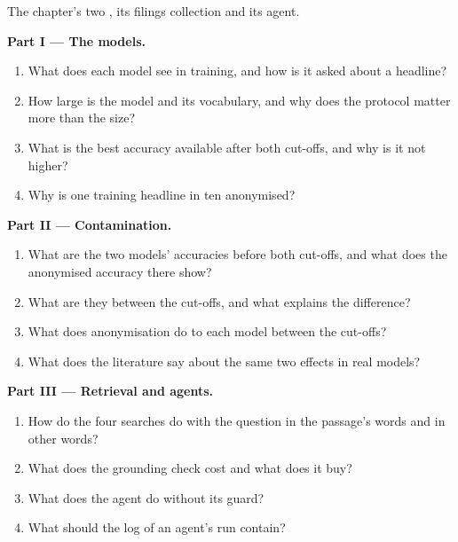 \begin{problem}\label{pb:ml:large-language-models-in-finance:1}
The chapter's two , its filings collection and its agent.

\medskip\noindent\textbf{Part I --- The models.}
\begin{enumerate}
\item What does each model see in training, and how is it asked about a headline?
\item How large is the model and its vocabulary, and why does the protocol matter more than the size?
\item What is the best accuracy available after both cut-offs, and why is it not higher?
\item Why is one training headline in ten anonymised?
\end{enumerate}

\medskip\noindent\textbf{Part II --- Contamination.}
\begin{enumerate}[resume]
\item What are the two models' accuracies before both cut-offs, and what does the anonymised accuracy there show?
\item What are they between the cut-offs, and what explains the difference?
\item What does anonymisation do to each model between the cut-offs?
\item What does the literature say about the same two effects in real models?
\end{enumerate}

\medskip\noindent\textbf{Part III --- Retrieval and agents.}
\begin{enumerate}[resume]
\item How do the four searches do with the question in the passage's words and in other words?
\item What does the grounding check cost and what does it buy?
\item What does the agent do without its guard?
\item What should the log of an agent's run contain?
\end{enumerate}


\end{problem}
